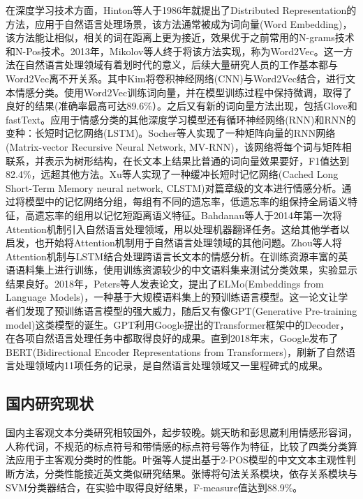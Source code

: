 在深度学习技术方面，Hinton等\cite{hinton1986learning}人于1986年就提出了Distributed Representation的方法，应用于自然语言处理场景，该方法通常被成为词向量(Word Embedding)，该方法能让相似，相关的词在距离上更为接近，效果优于之前常用的N-grams技术和N-Pos技术。2013年，Mikolov等\cite{mikolov2013efficient}人终于将该方法实现，称为Word2Vec。这一方法在自然语言处理领域有着划时代的意义，后续大量研究人员的工作基本都与Word2Vec离不开关系。其中Kim\cite{kim2014convolutional}将卷积神经网络(CNN)与Word2Vec结合，进行文本情感分类。使用Word2Vec训练词向量，并在模型训练过程中保持微调，取得了良好的结果(准确率最高可达89.6\%）。之后又有新的词向量方法出现，包括Glove\cite{pennington2014glove}和fastText\cite{joulin2016fasttext}。应用于情感分类的其他深度学习模型还有循环神经网络(RNN)和RNN的变种：长短时记忆网络(LSTM)。Socher等\cite{socher2012semantic}人实现了一种矩阵向量的RNN网络(Matrix-vector Recursive Neural Network, MV-RNN)，该网络将每个词与矩阵相联系，并表示为树形结构，在长文本上结果比普通的词向量效果要好，F1值达到82.4\%，远超其他方法。Xu等\cite{xu2016cached}人实现了一种缓冲长短时记忆网络(Cached Long Short-Term Memory neural network, CLSTM)对篇章级的文本进行情感分析。通过将模型中的记忆网络分组，每组有不同的遗忘率，低遗忘率的组保持全局语义特征，高遗忘率的组用以记忆短距离语义特征。Bahdanau等\cite{bahdanau2014neural}人于2014年第一次将Attention机制引入自然语言处理领域，用以处理机器翻译任务。这给其他学者以启发，也开始将Attention机制用于自然语言处理领域的其他问题。Zhou等\cite{zhou2016attention}人将Attention机制与LSTM结合处理跨语言长文本的情感分析。在训练资源丰富的英语语料集上进行训练，使用训练资源较少的中文语料集来测试分类效果，实验显示结果良好。2018年，Peters等\cite{peters2018deep}人发表论文，提出了ELMo(Embeddings from Language Models)，一种基于大规模语料集上的预训练语言模型。这一论文让学者们发现了预训练语言模型的强大威力，随后又有像GPT(Generative Pre-training model)\cite{radford2018improving}这类模型的诞生。GPT利用Google提出的Transformer\cite{vaswani2017attention}框架中的Decoder，在各项自然语言处理任务中都取得良好的成果。直到2018年末，Google发布了BERT(Bidirectional Encoder Representations from Transformers)\cite{devlin2018bert}，刷新了自然语言处理领域内11项任务的记录，是自然语言处理领域又一里程碑式的成果。

\subsection{国内研究现状}
国内主客观文本分类研究相较国外，起步较晚。姚天昉和彭思崴\cite{__2007姚天昉}利用情感形容词，人称代词，不规范的标点符号和带情感的标点符号等作为特征，比较了四类分类算法应用于主客观分类时的性能。叶强等\cite{__2007叶强}人提出基于2-POS模型的中文文本主观性判断方法，分类性能接近英文类似研究结果。张博\cite{_svm_2011}将句法关系模块，依存关系模块与SVM分类器结合，在实验中取得良好结果，F-measure值达到88.9\%。

